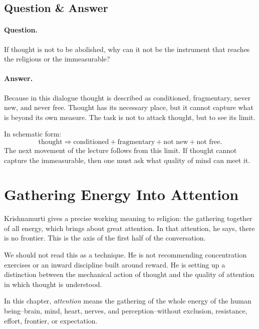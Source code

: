 \subsection{Question \& Answer}

\paragraph{Question.}
If thought is not to be abolished, why can it not be the instrument that reaches the religious or the immeasurable?

\paragraph{Answer.}
Because in this dialogue thought is described as conditioned, fragmentary, never new, and never free. Thought has its necessary place, but it cannot capture what is beyond its own measure. The task is not to attack thought, but to see its limit.

In schematic form:
\begin{equation}
\text{thought}
\Rightarrow
\text{conditioned}+\text{fragmentary}+\text{not new}+\text{not free}.
\end{equation}
The next movement of the lecture follows from this limit. If thought cannot capture the immeasurable, then one must ask what quality of mind can meet it.

\section{Gathering Energy Into Attention}

Krishnamurti gives a precise working meaning to religion: the gathering together of all energy, which brings about great attention. In that attention, he says, there is no frontier. This is the axis of the first half of the conversation.

We should not read this as a technique. He is not recommending concentration exercises or an inward discipline built around reward. He is setting up a distinction between the mechanical action of thought and the quality of attention in which thought is understood.

\begin{definition}
In this chapter, \emph{attention} means the gathering of the whole energy of the human being--brain, mind, heart, nerves, and perception--without exclusion, resistance, effort, frontier, or expectation.
\end{definition}

